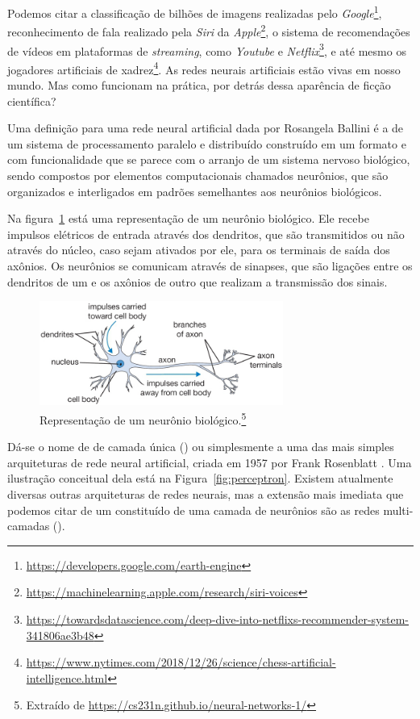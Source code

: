 Podemos citar a classificação de bilhões de imagens realizadas pelo \emph{Google}\footnote{\url{https://developers.google.com/earth-engine}}, reconhecimento de fala realizado pela \emph{Siri} da \emph{Apple}\footnote{\url{https://machinelearning.apple.com/research/siri-voices}}, o sistema de recomendações de vídeos em plataformas de \emph{streaming}, como \emph{Youtube} e \emph{Netflix}\footnote{\url{https://towardsdatascience.com/deep-dive-into-netflixs-recommender-system-341806ae3b48}}, e até mesmo os jogadores artificiais de xadrez\footnote{\url{https://www.nytimes.com/2018/12/26/science/chess-artificial-intelligence.html}}. As redes neurais artificiais estão vivas em nosso mundo. Mas como funcionam na prática, por detrás dessa aparência de ficção científica?

Uma definição para uma rede neural artificial dada por Rosangela Ballini \citep{doutorado} é a de um sistema de processamento paralelo e distribuído construído em um formato e com funcionalidade que se parece com o arranjo de um sistema nervoso biológico, sendo compostos por elementos computacionais chamados neurônios, que são organizados e interligados em padrões semelhantes aos neurônios biológicos.

Na figura~\ref{fig:neuron} está uma representação de um neurônio biológico. Ele recebe impulsos elétricos de entrada através dos dendritos, que são transmitidos ou não através do núcleo, caso sejam ativados por ele, para os terminais de saída dos axônios. Os neurônios se comunicam através de sinapses, que são ligações entre os dendritos de um e os axônios de outro que realizam a transmissão dos sinais. 

\begin{figure}[htb]
\centering
\includegraphics[width=8cm]{figuras/neuron}
\caption{Representação de um neurônio biológico.\footnote{Extraído de \url{https://cs231n.github.io/neural-networks-1/}}}
\label{fig:neuron}
\end{figure}

Dá-se o nome de  de camada única () ou simplesmente  a uma das mais simples arquiteturas de rede neural artificial, criada em 1957 por Frank Rosenblatt \citep{frank}. Uma ilustração conceitual dela está na Figura~\ref{fig:perceptron}. Existem atualmente diversas outras arquiteturas de redes neurais, mas a extensão mais imediata que podemos citar de um  constituído de uma camada de neurônios são as redes  multi-camadas (). 

